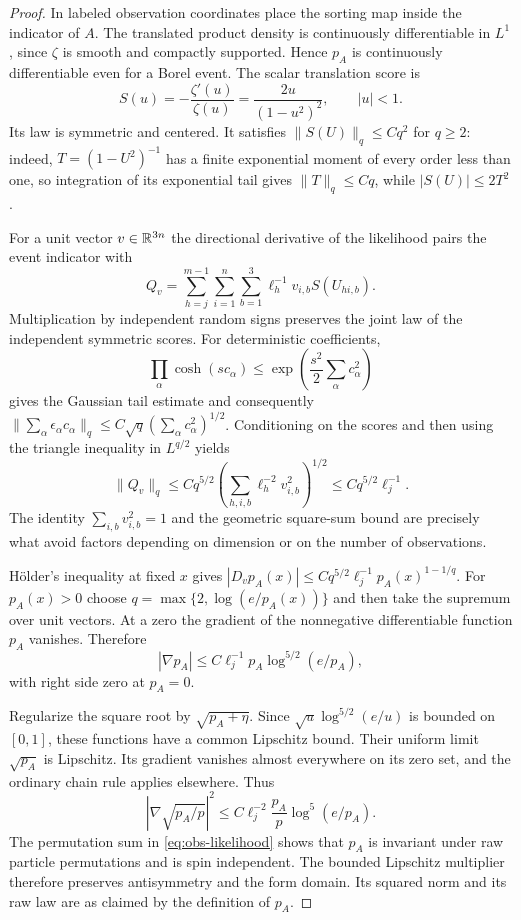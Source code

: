 \begin{proof}
In labeled observation coordinates place the sorting map inside
the indicator of $A$. The translated product density is continuously
differentiable in $L^1$, since $\zeta$ is smooth and compactly
supported. Hence $p_A$ is continuously differentiable even for a
Borel event. The scalar translation score is
\[
 S(u)=-\frac{\zeta'(u)}{\zeta(u)}
       =\frac{2u}{(1-u^2)^2},\qquad |u|<1.
\]
Its law is symmetric and centered. It satisfies
$\|S(U)\|_q\le Cq^2$ for $q\ge2$: indeed,
$T=(1-U^2)^{-1}$ has a finite exponential moment of every order
less than one, so integration of its exponential tail gives
$\|T\|_q\le Cq$, while $|S(U)|\le2T^2$.

For a unit vector $v\in\mathbb R^{3n}$ the directional derivative of the
likelihood pairs the event indicator with
\[
 Q_v=\sum_{h=j}^{m-1}\sum_{i=1}^n\sum_{b=1}^3
                    \ell_h^{-1}v_{i,b}S(U_{hi,b}).
\]
Multiplication by independent random signs preserves the joint law
of the independent symmetric scores. For deterministic coefficients,
\[
 \prod_\alpha\cosh(sc_\alpha)
       \le\exp\!\left(\frac{s^2}{2}\sum_\alpha c_\alpha^2\right)
\]
gives the Gaussian tail estimate and consequently
$\|\sum_\alpha\epsilon_\alpha c_\alpha\|_q
 \le C\sqrt q(\sum_\alpha c_\alpha^2)^{1/2}$.
Conditioning on the scores and then using the triangle inequality
in $L^{q/2}$ yields
\[
 \|Q_v\|_q\le Cq^{5/2}
       \left(\sum_{h,i,b}\ell_h^{-2}v_{i,b}^2\right)^{1/2}
       \le Cq^{5/2}\ell_j^{-1}.
\]
The identity $\sum_{i,b}v_{i,b}^2=1$ and the geometric square-sum
bound are precisely what avoid factors depending on dimension
or on the number of observations.

H\"older's inequality at fixed $x$ gives
$|D_vp_A(x)|\le Cq^{5/2}\ell_j^{-1}p_A(x)^{1-1/q}$.
For $p_A(x)>0$ choose $q=\max\{2,\log(e/p_A(x))\}$ and then take
the supremum over unit vectors. At a zero the gradient of the
nonnegative differentiable function $p_A$ vanishes. Therefore
\begin{equation}\label{eq:obs-score-gradient}
 |\nabla p_A|\le C\ell_j^{-1}p_A\log^{5/2}(e/p_A),
\end{equation}
with right side zero at $p_A=0$.

Regularize the square root by $\sqrt{p_A+\eta}$. Since
$\sqrt u\log^{5/2}(e/u)$ is bounded on $[0,1]$, these functions
have a common Lipschitz bound. Their uniform limit $\sqrt{p_A}$ is
Lipschitz. Its gradient vanishes almost everywhere on its zero set,
and the ordinary chain rule applies elsewhere. Thus
\[
 \left|\nabla\sqrt{p_A/p}\right|^2
       \le C\ell_j^{-2}\frac{p_A}{p}\log^5(e/p_A).
\]
The permutation sum in \eqref{eq:obs-likelihood} shows that $p_A$
is invariant under raw particle permutations and is spin independent.
The bounded Lipschitz multiplier therefore preserves antisymmetry
and the form domain. Its squared norm and its raw law are as claimed
by the definition of $p_A$.


\end{proof}
